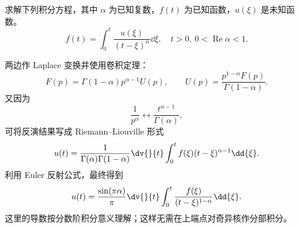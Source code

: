 \begin{question}
求解下列积分方程，其中 \(\alpha\) 为已知复数，\(f(t)\) 为已知函数，\(u(\xi)\) 是未知函数。\[ f(t)=\int_0^t \frac{u(\xi)}{(t-\xi)^\alpha}\dd{}\xi,\quad t>0,\ 0<\operatorname{Re}\alpha<1. \]
\begin{solution}
两边作 Laplace 变换并使用卷积定理：
\[
F(p)=\Gamma(1-\alpha)p^{\alpha-1}U(p),
\qquad
U(p)=\frac{p^{1-\alpha}F(p)}{\Gamma(1-\alpha)}.
\]
又因为
\[
\frac1{p^\alpha}
\longleftrightarrow
\frac{t^{\alpha-1}}{\Gamma(\alpha)},
\]
可将反演结果写成 Riemann--Liouville 形式
\[
u(t)
=\frac{1}{\Gamma(\alpha)\Gamma(1-\alpha)}
\dv{}{t}\int_0^t f(\xi)(t-\xi)^{\alpha-1}\dd{\xi}.
\]
利用 Euler 反射公式，最终得到
\[
u(t)
=\frac{\sin(\pi\alpha)}{\pi}
\dv{}{t}\int_0^t
\frac{f(\xi)}{(t-\xi)^{1-\alpha}}\dd{\xi}.
\]
这里的导数按分数阶积分意义理解；这样无需在上端点对奇异核作分部积分。
\end{solution}
\end{question}

